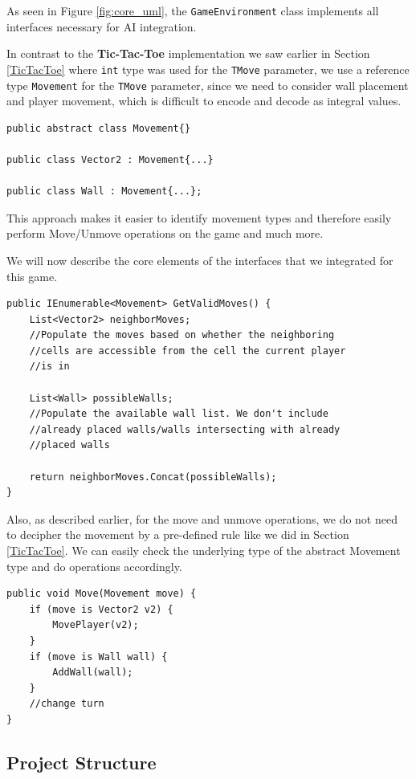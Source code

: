 As seen in Figure \ref{fig:core_uml}, the \texttt{GameEnvironment} class implements all interfaces necessary for \gls{AI} integration.

In contrast to the \textbf{Tic-Tac-Toe} implementation we saw earlier in Section \ref{TicTacToe} where \texttt{int} type was used for the \texttt{TMove} parameter, we use a reference type \texttt{Movement} for the \texttt{TMove} parameter, since we need to consider wall placement and player movement, which is difficult to encode and decode as integral values.

\begin{lstlisting}
public abstract class Movement{}

public class Vector2 : Movement{...}

public class Wall : Movement{...};
\end{lstlisting}

This approach makes it easier to identify movement types and therefore easily perform Move/Unmove operations on the game and much more.

We will now describe the core elements of the interfaces that we integrated for this game.

\begin{lstlisting}
public IEnumerable<Movement> GetValidMoves() {
    List<Vector2> neighborMoves;
    //Populate the moves based on whether the neighboring
    //cells are accessible from the cell the current player
    //is in

    List<Wall> possibleWalls;
    //Populate the available wall list. We don't include
    //already placed walls/walls intersecting with already
    //placed walls

    return neighborMoves.Concat(possibleWalls);
}
\end{lstlisting}

Also, as described earlier, for the move and unmove operations, we do not need to decipher the movement by a pre-defined rule like we did in Section \ref{TicTacToe}. We can easily check the underlying type of the abstract Movement type and do operations accordingly.

\begin{lstlisting}
public void Move(Movement move) {
    if (move is Vector2 v2) {
        MovePlayer(v2);
    }
    if (move is Wall wall) {
        AddWall(wall);
    }
    //change turn
}
\end{lstlisting}



\subsection{Project Structure}

